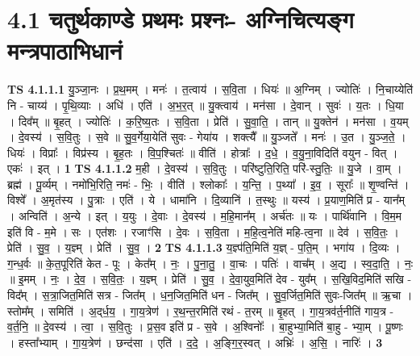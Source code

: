 \documentclass[17pt]{extarticle}
\begin{document}
\section*{ 4.1     चतुर्थकाण्डे प्रथमः प्रश्नः- अग्निचित्यङ्ग मन्त्रपाठाभिधानं }
                                \textbf{ TS 4.1.1.1} \newline
                  यु॒ञ्जा॒नः । प्र॒थ॒मम् । मनः॑ । त॒त्वाय॑ । स॒वि॒ता । धियः॑ ॥ अ॒ग्निम् । ज्योतिः॑ । नि॒चाय्येति॑ नि - चाय्य॑ । पृ॒थि॒व्याः । अधि॑ । एति॑ । अ॒भ॒र॒त् ॥ यु॒क्त्वाय॑ । मन॑सा । दे॒वान् । सुवः॑ । य॒तः । धि॒या । दिव᳚म् ॥ बृ॒हत् । ज्योतिः॑ । क॒रि॒ष्य॒तः । स॒वि॒ता । प्रेति॑ । सु॒वा॒ति॒ । तान् ॥ यु॒क्तेन॑ । मन॑सा । व॒यम् । दे॒वस्य॑ । स॒वि॒तुः । स॒वे ॥ सु॒व॒र्गेया॒येति॑ सुवः - गेया॑य । शक्त्यै᳚ ॥ यु॒ञ्जते᳚ । मनः॑ । उ॒त । यु॒ञ्ज॒ते॒ । धियः॑ । विप्राः᳚ । विप्र॑स्य । बृ॒ह॒तः । वि॒प॒श्चितः॑ ॥ वीति॑ । होत्राः᳚ । द॒धे॒ । व॒यु॒ना॒विदिति॑ वयुन - वित् । एकः॑ । इत् । \textbf{  1} \newline
                  \newline
                                \textbf{ TS 4.1.1.2} \newline
                  म॒ही । दे॒वस्य॑ । स॒वि॒तुः । परि॑ष्टुति॒रिति॒ परि॑-स्तु॒तिः॒ ॥ यु॒जे । वा॒म् । ब्रह्म॑ । पू॒र्व्यम् । नमो॑भि॒रिति॒ नमः॑ - भिः॒ । वीति॑ । श्लोकाः᳚ । य॒न्ति॒ । प॒थ्या᳚ । इ॒व॒ । सूराः᳚ ॥ शृ॒ण्वन्ति॑ । विश्वे᳚ । अ॒मृत॑स्य । पु॒त्राः । एति॑ । ये । धामा॑नि । दि॒व्यानि॑ । त॒स्थुः ॥ यस्य॑ । प्र॒याण॒मिति॑ प्र - यान᳚म् । अन्विति॑ । अ॒न्ये । इत् । य॒युः । दे॒वाः । दे॒वस्य॑ । म॒हि॒मान᳚म् । अर्च॑तः ॥ यः । पार्थि॑वानि । वि॒म॒म इति॑ वि - म॒मे । सः । एत॑शः । रजाꣳ॑सि । दे॒वः । स॒वि॒ता । म॒हि॒त्व॒नेति॑ महि-त्व॒ना ॥ देव॑ । स॒वि॒तः॒ । प्रेति॑ । सु॒व॒ । य॒ज्ञ्म् । प्रेति॑ । सु॒व॒ । \textbf{  2} \newline
                  \newline
                                \textbf{ TS 4.1.1.3} \newline
                  य॒ज्ञ्प॑ति॒मिति॑ य॒ज्ञ् - प॒ति॒म् । भगा॑य । दि॒व्यः । ग॒न्ध॒र्वः ॥ के॒त॒पूरिति॑ केत - पूः । केत᳚म् । नः॒ । पु॒ना॒तु॒ । वा॒चः । पतिः॑ । वाच᳚म् । अ॒द्य । स्व॒दा॒ति॒ । नः॒ ॥ इ॒मम् । नः॒ । दे॒व॒ । स॒वि॒तः॒ । य॒ज्ञ्म् । प्रेति॑ । सु॒व॒ । दे॒वा॒युव॒मिति॑ देव - युव᳚म् । स॒खि॒विद॒मिति॑ सखि - विद᳚म् । स॒त्रा॒जित॒मिति॑ सत्र - जित᳚म् । ध॒न॒जित॒मिति॑ धन - जित᳚म् । सु॒व॒र्जित॒मिति॑ सुवः-जित᳚म् ॥ ऋ॒चा । स्तोम᳚म् । समिति॑ । अ॒द्‌र्ध॒य॒ । गा॒य॒त्रेण॑ । र॒थ॒न्त॒रमिति॑ रथं - त॒रम् ॥ बृ॒हत् । गा॒य॒त्रव॑र्त॒नीति॑ गाय॒त्र - व॒र्त॒नि॒ ॥ दे॒वस्य॑ । त्वा॒ । स॒वि॒तुः । प्र॒स॒व इति॑ प्र - स॒वे । अ॒श्विनोः᳚ । बा॒हुभ्या॒मिति॑ बा॒हु - भ्या॒म् । पू॒ष्णः । हस्ता᳚भ्याम् । गा॒य॒त्रेण॑ । छन्द॑सा । एति॑ । द॒दे॒ । अ॒ङ्गि॒र॒स्वत् । अभ्रिः॑ । अ॒सि॒ । नारिः॑ । \textbf{  3} \newline
\end{document}
